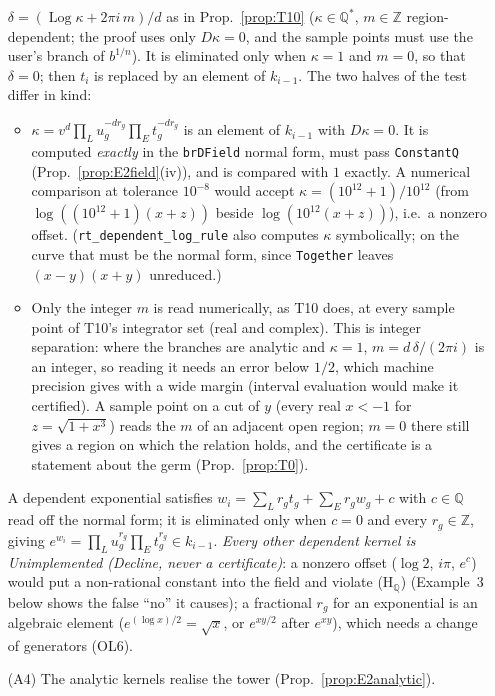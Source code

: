 \documentclass[11pt]{article}
\theoremstyle{definition}
\theoremstyle{remark}
\newcommand{\Q}{\mathbb{Q}}
\newcommand{\Z}{\mathbb{Z}}
\newcommand{\code}[1]{\texttt{#1}}
\begin{document}
\begin{enumerate}
  $\delta=(\operatorname{Log}\kappa+2\pi i\,m)/d$ as in Prop.~\ref{prop:T10} ($\kappa\in\Q^*$,
  $m\in\Z$ region-dependent; the proof uses only $D\kappa=0$, and the sample points must use
  the user's branch of $b^{1/n}$). It is eliminated only when $\kappa=1$ and $m=0$, so that
  $\delta=0$; then $t_i$ is replaced by an element of $k_{i-1}$. The two halves of the test
  differ in kind:
  \begin{itemize}
  \item $\kappa=v^d\prod_Lu_g^{-dr_g}\prod_Et_g^{-dr_g}$ is an element of $k_{i-1}$ with
    $D\kappa=0$. It is computed \emph{exactly} in the \code{brDField} normal form, must pass
    \code{ConstantQ} (Prop.~\ref{prop:E2field}(iv)), and is compared with $1$ exactly. A
    numerical comparison at tolerance $10^{-8}$ would accept
    $\kappa=(10^{12}+1)/10^{12}$ (from $\log((10^{12}+1)(x+z))$ beside $\log(10^{12}(x+z))$),
    i.e.\ a nonzero offset. (\code{rt\_dependent\_log\_rule} also computes $\kappa$
    symbolically; on the curve that must be the normal form, since \code{Together} leaves
    $(x-y)(x+y)$ unreduced.)
  \item Only the integer $m$ is read numerically, as T10 does, at every sample point of T10's
    integrator set (real and complex). This is integer separation: where the branches are
    analytic and $\kappa=1$, $m=d\,\delta/(2\pi i)$ is an integer, so reading it needs an error
    below $1/2$, which machine precision gives with a wide margin (interval evaluation would make it
    certified). A sample point on a cut of $y$ (every real $x<-1$ for $z=\sqrt{1+x^3}$) reads
    the $m$ of an adjacent open region; $m=0$ there still gives a region on which the relation
    holds, and the certificate is a statement about the germ (Prop.~\ref{prop:T0}).
  \end{itemize} A dependent exponential satisfies $w_i=\sum_Lr_gt_g+
  \sum_Er_gw_g+c$ with $c\in\Q$ read off the normal form; it is eliminated only when $c=0$ and
  every $r_g\in\Z$, giving $e^{w_i}=\prod_Lu_g^{r_g}\prod_Et_g^{r_g}\in k_{i-1}$. \emph{Every
  other dependent kernel is Unimplemented (Decline, never a certificate)}: a nonzero offset
  ($\log2$, $i\pi$, $e^c$) would put a non-rational constant into the field and violate
  (H$_\Q$) (Example~3 below shows the false ``no'' it causes); a fractional $r_g$ for an
  exponential is an algebraic element ($e^{(\log x)/2}=\sqrt x$, or $e^{xy/2}$ after $e^{xy}$),
  which needs a change of generators (OL6).
\item[(A4)] The analytic kernels realise the tower (Prop.~\ref{prop:E2analytic}).
\end{enumerate}
\end{document}
